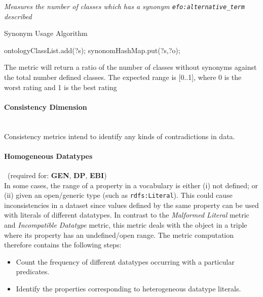 \begin{mdframed}[style=metricdefinition]
\emph{Measures the number of classes which has a synonym \texttt{efo:alternative\_term} described}
\end{mdframed}

\begin{algorithm}
\caption{Synonym Usage Algorithm}
\begin{algorithmic}[1]
 ontologyClassList.add(?s); \EndIf
{} 
\State synonomHashMap.put(?s,?o);
\EndIf
\EndProcedure
\end{algorithmic}
\end{algorithm}

The metric will return a ratio of the number of classes without synonyms against the total number defined classes. The expected range is [0..1], where 0 is the worst rating and 1 is the best rating

\paragraph{Consistency Dimension}~\\ 
Consistency metrics intend to identify any kinds of contradictions in data.
\paragraph{Homogeneous Datatypes}~(required for: \textbf{GEN}, \textbf{DP}, \textbf{EBI})~\\
In some cases, the range of a property in a vocabulary is either (i) not defined; or (ii) given an open/generic type (such as \texttt{rdfs:Literal}).
This could cause inconsistencies in a dataset since values defined by the same property can be used with literals of different datatypes.
In contrast to the \emph{Malformed Literal} metric and \emph{Incompatible Datatype} metric, this metric deals  with the object in a triple where its property has an undefined/open range. 
The metric computation therefore contains the following steps:
\begin{itemize}
\item Count the frequency of different datatypes occurring with a particular predicates.
\item Identify the properties corresponding to heterogeneous datatype literals.
\end{itemize}

